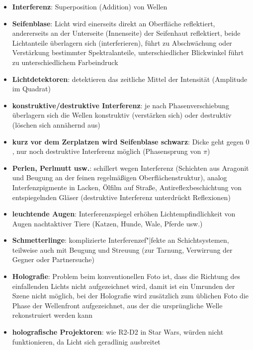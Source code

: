\begin{itemize}
    \item
    \textbf{Interferenz}:
    Superposition (Addition) von Wellen

    \item
    \textbf{Seifenblase}:
    Licht wird einerseits direkt an Oberfläche reflektiert,
    andererseits an der Unterseite (Innenseite) der Seifenhaut reflektiert,
    beide Lichtanteile überlagern sich (interferieren),
    führt zu Abschwächung oder Verstärkung bestimmter Spektralanteile,
    unterschiedlicher Blickwinkel führt zu unterschiedlichem Farbeindruck

    \item
    \textbf{Lichtdetektoren}:
    detektieren das zeitliche Mittel der Intensität (Amplitude im Quadrat)

    \item
    \textbf{konstruktive/destruktive Interferenz}:
    je nach Phasenverschiebung überlagern sich die Wellen konstruktiv
    (verstärken sich) oder destruktiv (löschen sich annähernd aus)

    \item
    \textbf{kurz vor dem Zerplatzen wird Seifenblase schwarz}:
    Dicke geht gegen $0$, nur noch destruktive Interferenz möglich
    (Phasensprung von $\pi$)

    \item
    \textbf{Perlen, Perlmutt usw.}:
    schillert wegen Interferenz
    (Schichten aus Aragonit und Beugung an der feinen regelmäßigen
    Oberflächenstruktur),
    analog Interfenzpigmente in Lacken,
    Ölfilm auf Straße,
    Antireflexbeschichtung von entspiegelnden Gläser
    (destruktive Interferenz unterdrückt Reflexionen)

    \item
    \textbf{leuchtende Augen}:
    Interferenzspiegel erhöhen Lichtempfindlichkeit von Augen nachtaktiver
    Tiere (Katzen, Hunde, Wale, Pferde usw.)

    \item
    \textbf{Schmetterlinge}:
    komplizierte Interferenzef"|fekte an Schichtsystemen, teilweise auch mit
    Beugung und Streuung
    (zur Tarnung, Verwirrung der Gegner oder Partnersuche)
\end{itemize}
\linie
\begin{itemize}
    \item
    \textbf{Holografie}:
    Problem beim konventionellen Foto ist,
    dass die Richtung des einfallenden Lichts nicht aufgezeichnet wird,
    damit ist ein Umrunden der Szene nicht möglich,
    bei der Holografie wird zusätzlich zum üblichen Foto die Phase der
    Wellenfront aufgezeichnet, aus der die ursprüngliche Welle
    rekonstruiert werden kann

    \item
    \textbf{holografische Projektoren}:
    wie R2-D2 in Star Wars,
    würden nicht funktionieren, da Licht sich geradlinig ausbreitet
\end{itemize}
